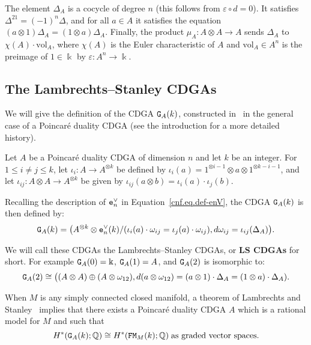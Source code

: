 The element $\Delta_{A}$ is a cocycle of degree $n$ (this follows from $\varepsilon \circ d = 0$).
It satisfies $\Delta^{21} = (-1)^{n} \Delta$, and for all $a \in A$ it satisfies the equation $(a \otimes 1) \Delta_{A} = (1 \otimes a) \Delta_{A}$.
Finally, the product $\mu_{A} : A \otimes A \to A$ sends $\Delta_{A}$ to $\chi(A) \cdot \mathrm{vol}_{A}$, where $\chi(A)$ is the Euler characteristic of $A$ and $\mathrm{vol}_{A} \in A^{n}$ is the preimage of $1 \in \Bbbk$ by $\varepsilon : A^{n} \to \Bbbk$.

\subsection{The Lambrechts--Stanley CDGAs}
\label{cnf.sec.kriz-lambr-stanl}

We will give the definition of the CDGA $\mathtt{G}_{A}(k)$, constructed in~\cite{LambrechtsStanley2008a} in the general case of a Poincaré duality CDGA (see the introduction for a more detailed history).

Let $A$ be a Poincaré duality CDGA of dimension $n$ and let $k$ be an integer.
For $1 \leq i \neq j \leq k$, let $\iota_{i} : A \to A^{\otimes k}$ be defined by $\iota_{i}(a) = 1^{\otimes i-1} \otimes a \otimes 1^{\otimes k-i-1}$, and let $\iota_{ij} : A \otimes A \to A^{\otimes k}$ be given by $\iota_{ij}(a \otimes b) = \iota_{i}(a) \cdot \iota_{j}(b)$.

Recalling the description of $\mathtt{e}_{n}^{\vee}$ in Equation~\eqref{cnf.eq.def-enV}, the CDGA $\mathtt{G}_{A}(k)$ is then defined by:
\begin{equation}
  \label{cnf.eq:9}
  \mathtt{G}_{A}(k) = \bigl( A^{\otimes k} \otimes \mathtt{e}_{n}^{\vee}(k) / ( \iota_{i}(a) \cdot \omega_{ij} = \iota_{j}(a) \cdot \omega_{ij} ), d \omega_{ij} = \iota_{ij}(\Delta_{A}) \bigr).
\end{equation}

We will call these CDGAs the Lambrechts--Stanley CDGAs, or \textbf{LS CDGAs} for short.
For example $\mathtt{G}_{A}(0) = \Bbbk$, $\mathtt{G}_{A}(1) = A$, and $\mathtt{G}_{A}(2)$ is isomorphic to:
\[ \mathtt{G}_{A}(2) \cong \bigl( (A \otimes A) \oplus (A \otimes \omega_{12}), d(a \otimes \omega_{12}) = (a \otimes 1) \cdot \Delta_{A} = (1 \otimes a) \cdot \Delta_{A}). \]

When $M$ is any simply connected closed manifold, a theorem of Lambrechts and Stanley~\cite{LambrechtsStanley2008a} implies that there exists a Poincaré duality CDGA $A$ which is a rational model for $M$ and such that
\begin{equation}
  \label{cnf.eq.ea-fmm-same-cohom}
  H^{*}(\mathtt{G}_{A}(k); \mathbb{Q}) \cong H^{*}(\mathtt{FM}_{M}(k); \mathbb{Q}) \; \text{as graded vector spaces}.
\end{equation}

